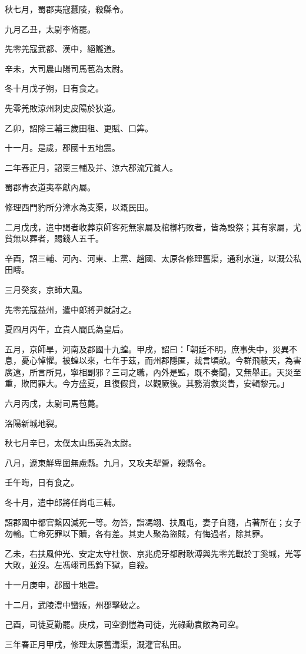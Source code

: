 \begin{pinyinscope}
秋七月，蜀郡夷寇蠶陵，殺縣令。

九月乙丑，太尉李脩罷。

先零羌寇武都、漢中，絕隴道。

辛未，大司農山陽司馬苞為太尉。

冬十月戊子朔，日有食之。

先零羌敗涼州刺史皮陽於狄道。

乙卯，詔除三輔三歲田租、更賦、口筭。

十一月。是歲，郡國十五地震。

二年春正月，詔稟三輔及并、涼六郡流冗貧人。

蜀郡青衣道夷奉獻內屬。

修理西門豹所分漳水為支渠，以溉民田。

二月戊戌，遣中謁者收葬京師客死無家屬及棺槨朽敗者，皆為設祭；其有家屬，尤貧無以葬者，賜錢人五千。

辛酉，詔三輔、河內、河東、上黨、趙國、太原各修理舊渠，通利水道，以溉公私田疇。

三月癸亥，京師大風。

先零羌寇益州，遣中郎將尹就討之。

夏四月丙午，立貴人閻氏為皇后。

五月，京師旱，河南及郡國十九蝗。甲戌，詔曰：「朝廷不明，庶事失中，災異不息，憂心悼懼。被蝗以來，七年于茲，而州郡隱匿，裁言頃畝。今群飛蔽天，為害廣遠，所言所見，寧相副邪？三司之職，內外是監，既不奏聞，又無舉正。天災至重，欺罔罪大。今方盛夏，且復假貸，以觀厥後。其務消救災眚，安輯黎元。」

六月丙戌，太尉司馬苞薨。

洛陽新城地裂。

秋七月辛巳，太僕太山馬英為太尉。

八月，遼東鮮卑圍無慮縣。九月，又攻夫犁營，殺縣令。

壬午晦，日有食之。

冬十月，遣中郎將任尚屯三輔。

詔郡國中都官繫囚減死一等。勿笞，詣馮翊、扶風屯，妻子自隨，占著所在；女子勿輸。亡命死罪以下贖，各有差。其吏人聚為盜賊，有悔過者，除其罪。

乙未，右扶風仲光、安定太守杜恢、京兆虎牙都尉耿溥與先零羌戰於丁奚城，光等大敗，並沒。左馮翊司馬鈞下獄，自殺。

十一月庚申，郡國十地震。

十二月，武陵澧中蠻叛，州郡擊破之。

己酉，司徒夏勤罷。庚戍，司空劉愷為司徒，光祿勳袁敞為司空。

三年春正月甲戌，修理太原舊溝渠，溉灌官私田。


\end{pinyinscope}
